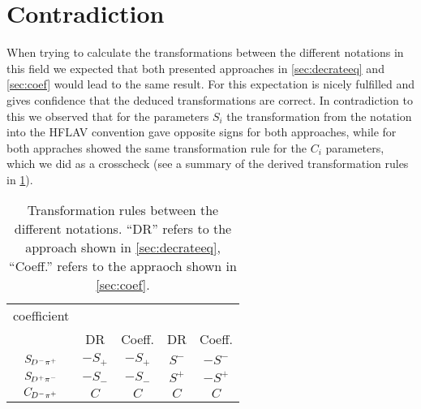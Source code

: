 \section{Contradiction}

When trying to calculate the transformations between the different notations in this field we expected that both presented
approaches in \cref{sec:decrateeq} and \cref{sec:coef} would lead to the same result. For \babar this expectation is nicely
fulfilled and gives confidence that the deduced transformations are correct. In contradiction to this we observed that for
the \CP parameters $S_{i}$ the transformation from the \belle notation into the HFLAV convention gave opposite signs for
both approaches, while for both appraches showed the same transformation rule for the $C_i$ parameters, which we did as a
crosscheck (see a summary of the derived transformation rules in \cref{tab:trans_sum}).
\begin{table}[htbp]
	\centering
	\caption{Transformation rules between the different notations. \enquote{DR} refers to the approach shown in \cref{sec:decrateeq},
	\enquote{Coeff.} refers to the appraoch shown in \cref{sec:coef}.}
	\begin{tabular}{c|cc|cc}
		\toprule
		\CP coefficient & \multicolumn{2}{c|}{\babar} & \multicolumn{2}{c}{\belle} \\
		 & DR & Coeff. & DR & Coeff. \\
		\midrule
        $\mbox{\ensuremath{S_{\kern -0.8pt D^{-}\pi^{+}}}}$ & $-S_{+}$ & $-S_{+}$ & $S^{-}$ & $-S^{-}$\\
        $\mbox{\ensuremath{S_{\kern -0.8pt D^{+}\pi^{-}}}}$ & $-S_{-}$ & $-S_{-}$ & $S^{+}$ & $-S^{+}$ \\
        $\mbox{\ensuremath{C_{\kern -0.8pt D^{-}\pi^{+}}}}$ & $C$ & $C$ & $C$ & $C$\\
		\bottomrule
	\end{tabular}
	\label{tab:trans_sum}
\end{table}
